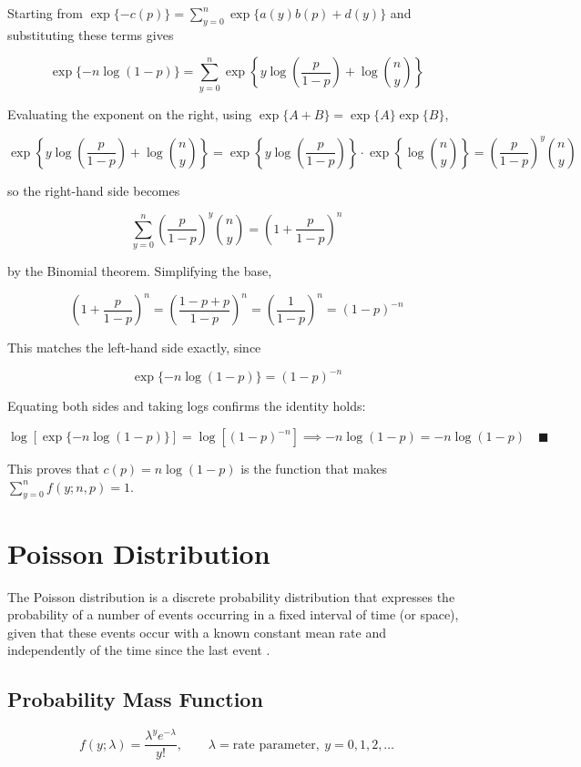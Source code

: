 Starting from $\exp\{-c(p)\} = \sum_{y=0}^n \exp\{a(y)b(p)+d(y)\}$ and substituting these terms gives
\begin{mathbox}
\[
\exp\{-n\log(1-p)\} = \sum_{y=0}^n \exp\left\{y\log\left(\frac{p}{1-p}\right) + \log\binom{n}{y}\right\}
\]
\end{mathbox}
Evaluating the exponent on the right, using $\exp\{A+B\}=\exp\{A\}\exp\{B\}$,
\begin{mathbox}
\[
\exp\left\{y\log\left(\frac{p}{1-p}\right) + \log\binom{n}{y}\right\} = \exp\left\{y\log\left(\frac{p}{1-p}\right)\right\}\cdot\exp\left\{\log\binom{n}{y}\right\} = \left(\frac{p}{1-p}\right)^y\binom{n}{y}
\]
\end{mathbox}
so the right-hand side becomes
\begin{mathbox}
\[
\sum_{y=0}^n \left(\frac{p}{1-p}\right)^y\binom{n}{y} = \left(1+\frac{p}{1-p}\right)^n
\]
\end{mathbox}
by the Binomial theorem. Simplifying the base,
\begin{mathbox}
\[
\left(1+\frac{p}{1-p}\right)^n = \left(\frac{1-p+p}{1-p}\right)^n = \left(\frac{1}{1-p}\right)^n = (1-p)^{-n}
\]
\end{mathbox}
This matches the left-hand side exactly, since
\begin{mathbox}
\[
\exp\{-n\log(1-p)\} = (1-p)^{-n}
\]
\end{mathbox}
Equating both sides and taking logs confirms the identity holds:
\begin{mathbox}
\[
\log\left[\exp\{-n\log(1-p)\}\right] = \log\left[(1-p)^{-n}\right] \implies -n\log(1-p) = -n\log(1-p) \quad\blacksquare
\]
\end{mathbox}
This proves that $c(p) = n\log(1-p)$ is the function that makes $\sum_{y=0}^n f(y;n,p) = 1$.

\section{Poisson Distribution}
The Poisson distribution is a discrete probability distribution that expresses the probability of a number of events occurring in a fixed interval of time (or space), given that these events occur with a known constant mean rate and independently of the time since the last event \citep{casella2002}.

\subsection*{Probability Mass Function}
\begin{mathbox}
\[
f(y;\lambda) = \frac{\lambda^y e^{-\lambda}}{y!}, \qquad \lambda = \text{rate parameter},\ y=0,1,2,\dots
\]
\end{mathbox}

